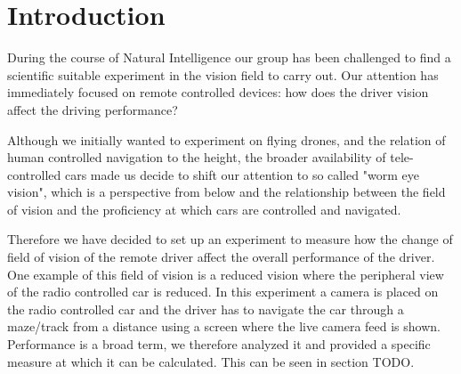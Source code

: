 \chapter{Introduction}
During the course of Natural Intelligence our group has been challenged to find a scientific suitable experiment in the vision field to carry out. Our attention has immediately focused on remote controlled devices: how does the driver vision affect the driving performance?

Although we initially wanted to experiment on flying drones, and the relation of human controlled navigation to the height, the broader availability of tele-controlled cars made us decide to shift our attention to so called "worm eye vision", which is a perspective from below and the relationship between the field of vision and the proficiency at which cars are controlled and navigated.
 
Therefore we have decided to set up an experiment to measure how the change of field of vision of the remote driver affect the overall performance of the driver. One example of this field of vision is a reduced vision where the peripheral view of the radio controlled car is reduced. In this experiment a camera is placed on the radio controlled car and the driver has to navigate the car through a maze/track from a distance using a screen where the live camera feed is shown. Performance is a broad term, we therefore analyzed it and provided a specific measure at which it can be calculated. This can be seen in section TODO.
